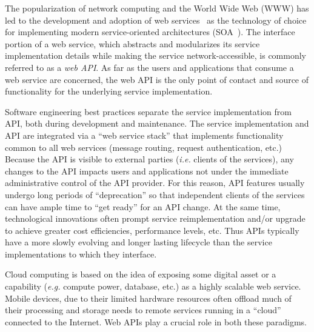 
The popularization of network computing and the World Wide Web (WWW) 
has led to the development and adoption of web services~\cite{6094008} as
the technology of choice for implementing modern service-oriented 
architectures (SOA~\cite{Haines:2010:SAM:1787234.1787269}).
The
interface portion of a web service, which abstracts and modularizes
its service implementation
details while making the service network-accessible, is commonly referred to
as a {\em web API}. As far as the users and applications that consume a 
web service
are concerned, the web API is the only point of contact and source of
functionality for the underlying service implementation.

Software engineering best practices separate the service implementation
from API, both during development and maintenance.
The service implementation and API are integrated via 
a ``web service stack'' that implements functionality common to all web
services (message routing, request authentication, etc.)
Because the API is visible to external parties ({\em i.e.} clients of the
services), any changes to the API
impacts users and applications not under the immediate administrative control
of the API provider.  For this reason, API features 
usually undergo long
periods of ``deprecation'' so that independent clients of the services can have
ample time to ``get ready'' for an API change.  At the same time,
technological innovations often prompt service reimplementation and/or 
upgrade to
achieve greater cost efficiencies, performance levels, etc.
Thus APIs typically have a more
slowly evolving and longer lasting lifecycle than the service
implementations
to which they interface. 

Cloud computing is based on the idea of exposing some digital asset or a
capability ({\em e.g.} compute power, database, etc.) 
as a highly scalable web service.  Mobile
devices, due to their limited hardware resources often offload much of their
processing and storage needs to remote services running in a ``cloud''
connected to the Internet.  Web APIs
play a crucial role in both these paradigms. 

